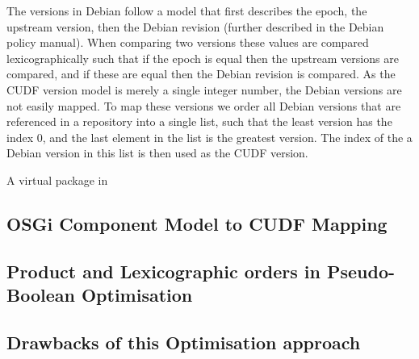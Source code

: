 The versions in Debian follow a model that first describes the epoch,
the upstream version, then the Debian revision (further described in the Debian policy manual). %
When comparing two versions these values are compared lexicographically such that
if the epoch is equal then the upstream versions are compared, 
and if these are equal then the Debian revision is compared.
As the CUDF version model is merely a single integer number, 
the Debian versions are not easily mapped.
To map these versions we order all Debian versions that are referenced in a repository into a single list, 
such that the least version has the index 0, and the last element in the list is the greatest version.
The index of the a Debian version in this list is then used as the CUDF version.

A virtual package in



\subsection{OSGi Component Model to CUDF Mapping}




\subsection{Product and Lexicographic orders in Pseudo-Boolean Optimisation}

\subsection{Drawbacks of this Optimisation approach}

